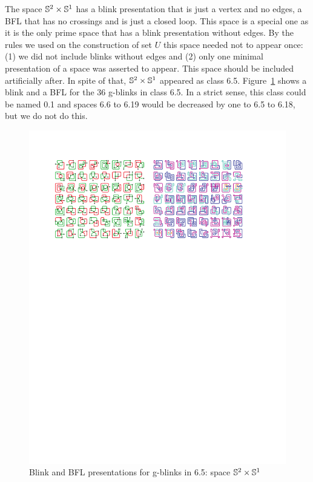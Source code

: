 The space $\mathbb{S}^2 \times \mathbb{S}^1$ has a blink presentation that is just a vertex
and no edges, \ie a BFL that has no crossings and is just a closed loop. This
space is a special one as it is the only prime space that has a blink presentation
without edges. By the rules we used on the construction of set $U$ this space
needed not to appear once: (1) we did not include blinks without edges and
(2) only one minimal presentation of a space was asserted to appear. This
space should be included artificially after. In spite of that, $\mathbb{S}^2 \times \mathbb{S}^1$
appeared as class 6.5. Figure~\ref{fig:gblinksForS1xS2inU} shows a blink
and a BFL for the 36 g-blinks in class 6.5. In a strict sense, this class
could be named 0.1 and spaces 6.6 to 6.19 would be decreased by one to 6.5
to 6.18, but we do not do this.

\begin{figure}[h!tp]
   \begin{center}
      \leavevmode
      \includegraphics[width=14cm]{fig/gblinksForS1xS2inU.pdf}
   \end{center}
   \vspace{-0.7cm}
   \caption{ Blink and BFL presentations for g-blinks in 6.5: space $\mathbb{S}^2 \times \mathbb{S}^1$}
   \label{fig:gblinksForS1xS2inU}
\end{figure}


